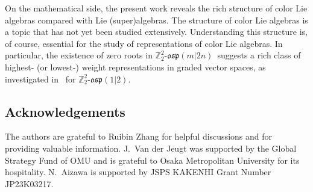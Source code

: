 \documentclass[pdftex]{sigma}
\numberwithin{equation}{section}
\theoremstyle{definition}
\def\Z2{\mathbb{Z}_2^2}
\def\osp{\mathfrak{osp}}
\def\Zosp{$\Z2$-$\osp(m|2n)$}
\begin{document}
On the mathematical side, the present work reveals the rich structure of color Lie algebras compared with Lie (super)algebras.
The structure of color Lie algebras is a topic that has not yet been studied extensively.
Understanding this structure is, of course, essential for the study of representations of color Lie algebras.
In particular, the existence of zero roots in \Zosp\ suggests a rich class of highest- (or lowest-) weight representations in graded vector spaces, as investigated in~\cite{AmaAi} for $\Z2$-$\osp(1|2)$.

\subsection*{Acknowledgements}

The authors are grateful to Ruibin Zhang for helpful discussions and for providing valuable information.
J.~Van der Jeugt was supported by the Global Strategy Fund of OMU and is grateful to Osaka Metropolitan University for its hospitality. N.~Aizawa is supported by JSPS KAKENHI Grant Number JP23K03217.
\end{document}
